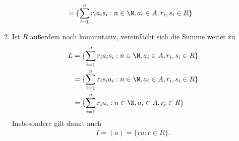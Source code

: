 \begin{solution}
\begin{enumerate}[label = (\arabic*)]
\begin{align*}
  &= \{\sum_{i = 1}^n r_ia_is_i: n \in \N, a_i \in A, r_i, s_i \in R \}
  \end{align*}
  \item Ist $R$ außerdem noch kommutativ, vereinfacht sich die Summe weiter zu
  \begin{align*}
    L &= \{\sum_{i = 1}^n r_ia_is_i: n \in \N, a_i \in A, r_i, s_i \in R \} \\
    &= \{\sum_{i = 1}^n r_is_ia_i: n \in \N, a_i \in A, r_i, s_i \in R \} \\
    &= \{\sum_{i = 1}^n r_ia_i: n \in \N, a_i \in A, r_i \in R \}
  \end{align*}
  Insbesondere gilt damit auch
  \begin{align*}
    I = (a) = \{ra: r \in R\}.
  \end{align*}
\end{enumerate}
\end{solution}
